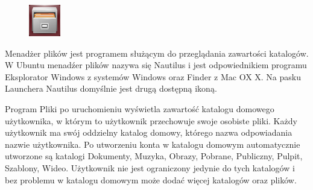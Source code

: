 \begin{figure}
	\vspace{-10pt}
	\includegraphics[width=\linewidth]{images/ikony_pliki.png}
\end{figure}

Menadżer plików jest programem służącym do przeglądania zawartości katalogów. W Ubuntu menadźer plików nazywa się \textcolor{ubuntu_orange}{Nautilus} i jest odpowiednikiem programu \textcolor{ubuntu_orange}{Eksplorator Windows} z systemów Windows oraz \textcolor{ubuntu_orange}{Finder} z Mac OX X. Na pasku Launchera Nautilus domyślnie jest drugą dostępną ikoną. 

Program Pliki po uruchomieniu wyświetla zawartość katalogu domowego użytkownika, w którym to użytkownik przechowuje swoje osobiste pliki. Każdy użytkownik ma swój oddzielny katalog domowy, którego nazwa odpowiadania nazwie użytkownika. Po utworzeniu konta w katalogu domowym automatycznie utworzone są katalogi Dokumenty, Muzyka, Obrazy, Pobrane, Publiczny, Pulpit, Szablony, Wideo. Użytkownik nie jest ograniczony jedynie do tych katalogów i bez problemu w katalogu domowym może dodać więcej katalogów oraz plików.

